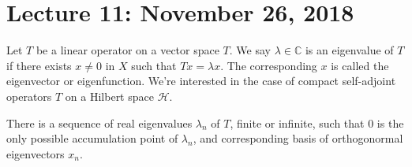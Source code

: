     \section{Lecture 11: November 26, 2018}
        Let $T$ be a linear operator on a vector space
        $T$. We say $\lambda\in\mathbb{C}$ is an
        eigenvalue of $T$ if there exists $x\ne{0}$ in
        $X$ such that $Tx=\lambda{x}$. The corresponding
        $x$ is called the eigenvector or eigenfunction.
        We're interested in the case of compact
        self-adjoint operators $T$ on a Hilbert space
        $\mathscr{H}$.
        \begin{theorem}
            There is a sequence of real eigenvalues
            $\lambda_{n}$ of $T$, finite or infinite,
            such that $0$ is the only possible
            accumulation point of $\lambda_{n}$, and
            corresponding basis of
            orthogonormal eigenvectors $x_{n}$.
        \end{theorem}
